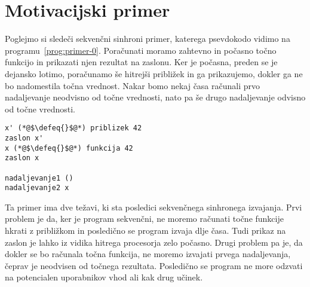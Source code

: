 \section{Motivacijski primer} \label{sec:primeri-aeff}

Poglejmo si sledeči sekvenčni sinhroni primer, katerega psevdokodo vidimo na programu~\ref{prog:primer-0}. Poračunati moramo zahtevno in počasno točno funkcijo in prikazati njen rezultat na zaslonu. Ker je počasna, preden se je dejansko lotimo, poračunamo še hitrejši približek in ga prikazujemo, dokler ga ne bo nadomestila točna vrednost. Nakar bomo nekaj časa računali prvo nadaljevanje neodvisno od točne vrednosti, nato pa še drugo nadaljevanje odvisno od točne vrednosti. 

\begin{lstlisting}[caption={Sinhron sekvečni primer.},label={prog:primer-0},floatplacement=H]
x' (*@$\defeq{}$@*) priblizek 42
zaslon x'
x (*@$\defeq{}$@*) funkcija 42
zaslon x

nadaljevanje1 ()
nadaljevanje2 x
\end{lstlisting}

Ta primer ima dve težavi, ki sta posledici sekvenčnega sinhronega izvajanja. Prvi problem je da, ker je program sekvenčni, ne moremo računati točne funkcije hkrati z približkom in posledično se program izvaja dlje časa. Tudi prikaz na zaslon je lahko iz vidika hitrega procesorja zelo počasno. Drugi problem pa je, da dokler se bo računala točna funkcija, ne moremo izvajati prvega nadaljevanja, čeprav je neodvisen od točnega rezultata. Posledično se program ne more odzvati na potencialen uporabnikov vhod ali kak drug učinek.  

